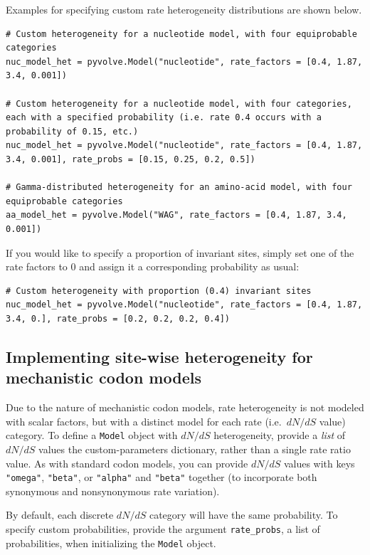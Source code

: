 \documentclass{article}
\newcommand{\code}[1]{\texttt{\small{#1}}}
\begin{document}
Examples for specifying custom rate heterogeneity distributions are shown below.
\begin{lstlisting}
# Custom heterogeneity for a nucleotide model, with four equiprobable categories
nuc_model_het = pyvolve.Model("nucleotide", rate_factors = [0.4, 1.87, 3.4, 0.001])

# Custom heterogeneity for a nucleotide model, with four categories, each with a specified probability (i.e. rate 0.4 occurs with a probability of 0.15, etc.)
nuc_model_het = pyvolve.Model("nucleotide", rate_factors = [0.4, 1.87, 3.4, 0.001], rate_probs = [0.15, 0.25, 0.2, 0.5])

# Gamma-distributed heterogeneity for an amino-acid model, with four equiprobable categories
aa_model_het = pyvolve.Model("WAG", rate_factors = [0.4, 1.87, 3.4, 0.001])
\end{lstlisting}


If you would like to specify a proportion of invariant sites, simply set one of the rate factors to 0 and assign it a corresponding probability as usual:
\begin{lstlisting}
# Custom heterogeneity with proportion (0.4) invariant sites
nuc_model_het = pyvolve.Model("nucleotide", rate_factors = [0.4, 1.87, 3.4, 0.], rate_probs = [0.2, 0.2, 0.2, 0.4])
\end{lstlisting}


 
\subsection{Implementing site-wise heterogeneity for mechanistic codon models}\label{sec:sitehet_codon}

Due to the nature of mechanistic codon models, rate heterogeneity is not modeled with scalar factors, but with a distinct model for each rate (i.e.\, $dN/dS$ value) category. To define a \code{Model} object with $dN/dS$ heterogeneity, provide a \emph{list} of $dN/dS$ values the custom-parameters dictionary, rather than a single rate ratio value. As with standard codon models, you can provide $dN/dS$ values with keys \code{"omega"}, \code{"beta"}, or \code{"alpha"} and \code{"beta"} together (to incorporate both synonymous and nonsynonymous rate variation).

By default, each discrete $dN/dS$ category will have the same probability. To specify custom probabilities, provide the argument \code{rate\_probs}, a list of probabilities, when initializing the \code{Model} object.
\end{document}
